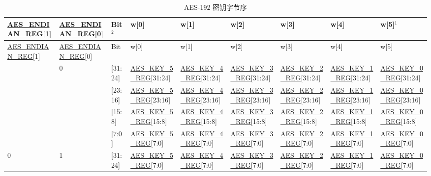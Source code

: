 \documentclass[main\_\_CN.tex]{subfiles}
\begin{document}
\begin{landscape}
\begin{tiny}
\begin{longtable}[c]
{ |p{1.5cm}|p{1.5cm}|p{0.5cm}|p{1.8cm}|p{1.8cm}|p{1.8cm}|p{1.8cm}|p{1.8cm}|p{1.8cm}|}
\caption{AES-192 密钥字节序}\label{table:AES192KeyEndian}\\
\hline
\rowcolor{lightgray}
\hyperref[regdesc:AESENDIANREG]{AES\_ENDIAN\_REG}[1]	&	\hyperref[regdesc:AESENDIANREG]{AES\_ENDIAN\_REG}[0]	&	Bit$^2$	&	w[0]	&	w[1]	&	w[2] 	&	w[3] 	&	w[4] 	&	w[5]$^1$	\\\hline
\endfirsthead
\hline
\rowcolor{lightgray}
\hyperref[regdesc:AESENDIANREG]{AES\_ENDIAN\_REG}[1]	&	\hyperref[regdesc:AESENDIANREG]{AES\_ENDIAN\_REG}[0]	&	Bit	&	w[0]	&	w[1]	&	w[2] 	&	w[3] 	&	w[4] 	&	w[5]	\\\hline
\endhead
\endfoot
\multirow{4}{4cm}{0} 	&	\multirow{4}{4cm}{0}	&	[31:24] 	&	\hyperref[regdesc:AESKEYnREG]{AES\_KEY\_5\_REG}[31:24]	&	\hyperref[regdesc:AESKEYnREG]{AES\_KEY\_4\_REG}[31:24] 	&	\hyperref[regdesc:AESKEYnREG]{AES\_KEY\_3\_REG}[31:24]	&	\hyperref[regdesc:AESKEYnREG]{AES\_KEY\_2\_REG}[31:24]	& \hyperref[regdesc:AESKEYnREG]{AES\_KEY\_1\_REG}[31:24]	&	\hyperref[regdesc:AESKEYnREG]{AES\_KEY\_0\_REG}[31:24]\\
\cline{3-9}
&&	[23:16] 	&	\hyperref[regdesc:AESKEYnREG]{AES\_KEY\_5\_REG}[23:16]	&	\hyperref[regdesc:AESKEYnREG]{AES\_KEY\_4\_REG}[23:16] 	&	\hyperref[regdesc:AESKEYnREG]{AES\_KEY\_3\_REG}[23:16]	&	\hyperref[regdesc:AESKEYnREG]{AES\_KEY\_2\_REG}[23:16] 	&	\hyperref[regdesc:AESKEYnREG]{AES\_KEY\_1\_REG}[23:16]	&	\hyperref[regdesc:AESKEYnREG]{AES\_KEY\_0\_REG}[23:16]\\
\cline{3-9}
&&	[15:8]	&	\hyperref[regdesc:AESKEYnREG]{AES\_KEY\_5\_REG}[15:8]	&	\hyperref[regdesc:AESKEYnREG]{AES\_KEY\_4\_REG}[15:8]	&	\hyperref[regdesc:AESKEYnREG]{AES\_KEY\_3\_REG}[15:8]	&	\hyperref[regdesc:AESKEYnREG]{AES\_KEY\_2\_REG}[15:8] 	&	\hyperref[regdesc:AESKEYnREG]{AES\_KEY\_1\_REG}[15:8]	&	\hyperref[regdesc:AESKEYnREG]{AES\_KEY\_0\_REG}[15:8]\\
\cline{3-9}
&&	[7:0]	&	\hyperref[regdesc:AESKEYnREG]{AES\_KEY\_5\_REG}[7:0]	&	\hyperref[regdesc:AESKEYnREG]{AES\_KEY\_4\_REG}[7:0]	&	\hyperref[regdesc:AESKEYnREG]{AES\_KEY\_3\_REG}[7:0]	&	\hyperref[regdesc:AESKEYnREG]{AES\_KEY\_2\_REG}[7:0] 	&	\hyperref[regdesc:AESKEYnREG]{AES\_KEY\_1\_REG}[7:0]	&	\hyperref[regdesc:AESKEYnREG]{AES\_KEY\_0\_REG}[7:0]\\
\hline
\multirow{4}{4cm}{0} 	&	\multirow{4}{4cm}{1}	&	[31:24] 	&	\hyperref[regdesc:AESKEYnREG]{AES\_KEY\_5\_REG}[7:0]	&	\hyperref[regdesc:AESKEYnREG]{AES\_KEY\_4\_REG}[7:0] 	&	\hyperref[regdesc:AESKEYnREG]{AES\_KEY\_3\_REG}[7:0]	&	\hyperref[regdesc:AESKEYnREG]{AES\_KEY\_2\_REG}[7:0] 	&	\hyperref[regdesc:AESKEYnREG]{AES\_KEY\_1\_REG}[7:0]	&	\hyperref[regdesc:AESKEYnREG]{AES\_KEY\_0\_REG}[7:0]\\

\end{longtable}
\end{tiny}
\end{landscape}
\end{document}
